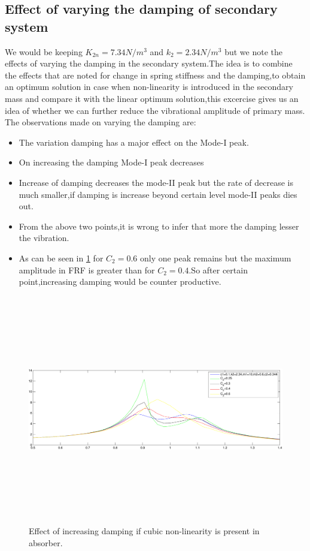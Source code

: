   \subsection{Effect of varying the damping of secondary system }
  We would be keeping $K_{2n}=7.34 N/m^3 $ and $k_2 =2.34 N/m^3$ but we note the effects of varying the damping in the secondary system.The idea is to combine the effects that are noted for change in spring stiffness and the damping,to obtain an optimum solution in case when non-linearity is introduced in the secondary mass and compare it with the linear optimum solution,this excercise gives us an idea of whether we can further reduce the vibrational amplitude of primary mass.
  The observations made on varying the damping are:
  \begin{itemize}
  \item The variation damping has a major effect on the Mode-I peak.
  \item On increasing the damping Mode-I peak decreases
  \item Increase of damping decreases the mode-II peak but the rate of decrease is much smaller,if damping is increase beyond certain level mode-II peaks dies out.
  \item From the above two points,it is wrong to infer that more the damping lesser the vibration.
  \item As can be seen in \ref{fig:non-linear secondary 3} for $C_2=0.6$ only one peak remains but the maximum amplitude in FRF is greater than for $C_2=0.4$.So after certain point,increasing damping would be counter productive.
  \end{itemize}
  \begin{figure}[h!]
  \includegraphics[width=16cm,height=10cm]{"figures/nonlinearity_secondary_3"}
  \caption{Effect of increasing damping if cubic non-linearity is present in absorber.}
  \label{fig:non-linear secondary 3}
  \end{figure}
